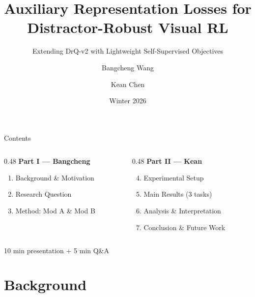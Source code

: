 \documentclass[aspectratio=169]{beamer}
\title[Auxiliary Losses for Visual RL]{Auxiliary Representation Losses for\\Distractor-Robust Visual RL}
\subtitle{Extending DrQ-v2 with Lightweight Self-Supervised Objectives}
\author{Bangcheng Wang \and Kean Chen}
\institute[]{University of Toronto --- CSC415: Introduction to Reinforcement Learning}
\date{Winter 2026}
\begin{document}
{
\frame{\titlepage}
}

\begin{frame}{Contents}

\begin{columns}[T]
\begin{column}{0.48\textwidth}
\textbf{Part I --- Bangcheng}
\begin{enumerate}
    \item Background \& Motivation
    \item Research Question
    \item Method: Mod A \& Mod B
\end{enumerate}
\end{column}
\begin{column}{0.48\textwidth}
\textbf{Part II --- Kean}
\begin{enumerate}
    \setcounter{enumi}{3}
    \item Experimental Setup
    \item Main Results (3 tasks)
    \item Analysis \& Interpretation
    \item Conclusion \& Future Work
\end{enumerate}
\end{column}
\end{columns}

\vspace{1em}
\centering
{\small 10 min presentation + 5 min Q\&A}

\end{frame}

\section{Background}
\end{document}
